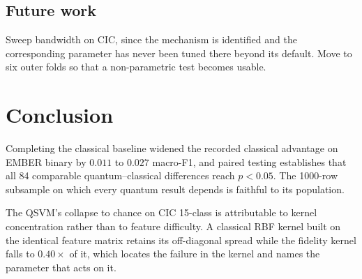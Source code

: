 \documentclass[11pt]{article}
\begin{document}
\subsection{Future work}

Sweep bandwidth on CIC, since the mechanism is identified and the corresponding
parameter has never been tuned there beyond its default. Move to six outer folds
so that a non-parametric test becomes usable.

\section{Conclusion}

Completing the classical baseline widened the recorded classical advantage on
EMBER binary by $0.011$ to $0.027$ macro-F1, and paired testing establishes that
all 84 comparable quantum--classical differences reach $p<0.05$. The 1000-row
subsample on which every quantum result depends is faithful to its population.

The QSVM's collapse to chance on CIC 15-class is attributable to kernel
concentration rather than to feature difficulty. A classical RBF kernel built on
the identical feature matrix retains its off-diagonal spread while the fidelity
kernel falls to $0.40\times$ of it, which locates the failure in the kernel and
names the parameter that acts on it.
\end{document}

